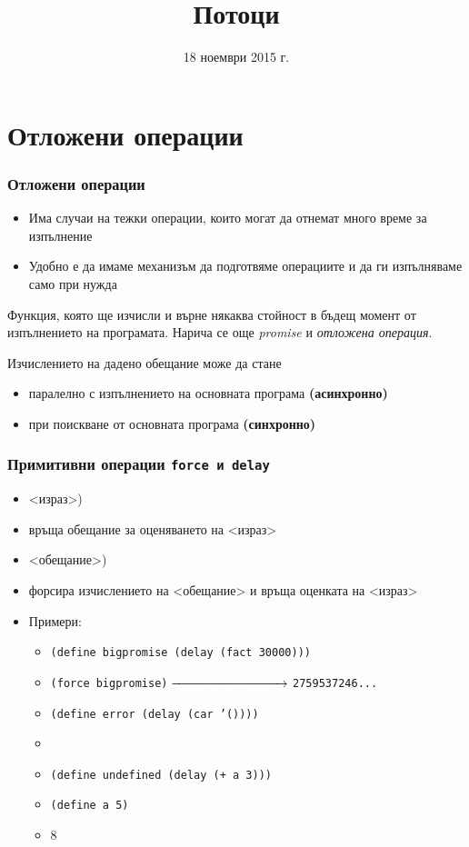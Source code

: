 \documentclass{beamer}
\title{Потоци}
\date{18 ноември 2015 г.}
\begin{document}
\begin{frame}
  \titlepage
\end{frame}

\section{Отложени операции}

\begin{frame}
  \frametitle{Отложени операции}
  \begin{itemize}[<+->]
  \item Има случаи на тежки операции, които могат да отнемат много време за изпълнение
  \item Удобно е да имаме механизъм да \alert{подготвяме} операциите и да ги \alert{изпълняваме} само при нужда
  \end{itemize}
  \onslide<+->
  \begin{definition}[Обещание]
    Функция, която ще изчисли и върне някаква стойност в бъдещ момент от изпълнението на програмата.
    \onslide<+->
    Нарича се още \emph{promise} и \emph{отложена операция}.
  \end{definition}
  \onslide<+->
  Изчислението на дадено обещание може да стане
  \begin{itemize}[<+->]
  \item паралелно с изпълнението на основната програма \textbf{(асинхронно)}
  \item при поискване от основната програма \textbf{(синхронно)}
  \end{itemize}
\end{frame}

\begin{frame}
  \frametitle{Примитивни операции \tt{force} и \tt{delay}}
  \begin{itemize}[<+->]
  \item {}<израз>\tta)
  \item връща \alert{обещание} за оценяването на <израз> 
  \item {}<обещание>\tta)
  \item форсира изчислението на <обещание> и връща оценката на <израз> 
    \pause
  \item Примери:
    \begin{itemize}
    \item \tt{(define bigpromise (delay (fact 30000)))}
    \item \tt{(force bigpromise)}$\;\xrightarrow{\hspace*{3cm}}\;$\tt{2759537246...}
    \item \tt{(define error (delay (car '())))}
    \item {}
    \item \tt{(define undefined (delay (+ a 3)))}
    \item \tt{(define a 5)}
    \item {}8
    \end{itemize}
  \end{itemize}
\end{frame}
\end{document}
